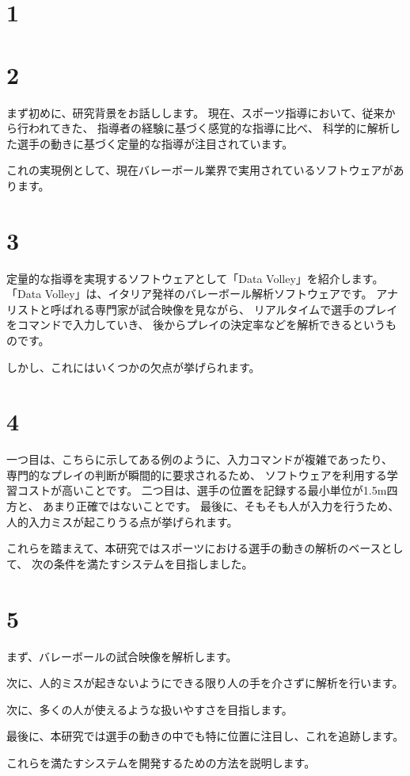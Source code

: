\documentclass[]{jsarticle}
\begin{document}
\section*{1}
\section*{2}
    まず初めに、研究背景をお話しします。
    現在、スポーツ指導において、従来から行われてきた、
    指導者の経験に基づく感覚的な指導に比べ、
    科学的に解析した選手の動きに基づく定量的な指導が注目されています。

    これの実現例として、現在バレーボール業界で実用されているソフトウェアがあります。
\section*{3}
    定量的な指導を実現するソフトウェアとして「Data Volley」を紹介します。
    「Data Volley」は、イタリア発祥のバレーボール解析ソフトウェアです。
    アナリストと呼ばれる専門家が試合映像を見ながら、
    リアルタイムで選手のプレイをコマンドで入力していき、
    後からプレイの決定率などを解析できるというものです。

    しかし、これにはいくつかの欠点が挙げられます。
\section*{4}
    一つ目は、こちらに示してある例のように、入力コマンドが複雑であったり、
    専門的なプレイの判断が瞬間的に要求されるため、
    ソフトウェアを利用する学習コストが高いことです。
    二つ目は、選手の位置を記録する最小単位が1.5m四方と、
    あまり正確ではないことです。
    最後に、そもそも人が入力を行うため、人的入力ミスが起こりうる点が挙げられます。

    これらを踏まえて、本研究ではスポーツにおける選手の動きの解析のベースとして、
    次の条件を満たすシステムを目指しました。
\section*{5}
    まず、バレーボールの試合映像を解析します。

    次に、人的ミスが起きないようにできる限り人の手を介さずに解析を行います。

    次に、多くの人が使えるような扱いやすさを目指します。

    最後に、本研究では選手の動きの中でも特に位置に注目し、これを追跡します。

    これらを満たすシステムを開発するための方法を説明します。
\end{document}
